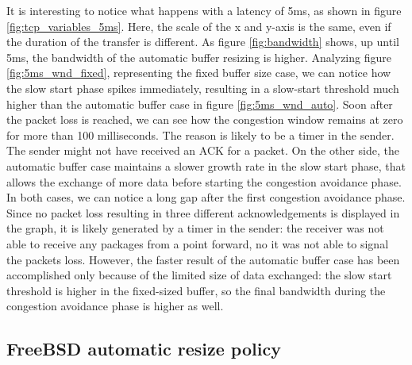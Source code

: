 \documentclass[a4paper,10pt]{article}
\begin{document}
It is interesting to notice what happens with a latency of 5ms, as shown in figure \ref{fig:tcp_variables_5ms}. Here, the scale of the x and y-axis is the same, even if the duration of the transfer is different. As figure \ref{fig:bandwidth} shows, up until 5ms, the bandwidth of the automatic buffer resizing is higher. 
Analyzing figure \ref{fig:5ms_wnd_fixed}, representing the fixed buffer size case, we can notice how the slow start phase spikes immediately, resulting in a slow-start threshold much higher than the automatic buffer case in figure \ref{fig:5ms_wnd_auto}. Soon after the packet loss is reached, we can see how the congestion window remains at zero for more than 100 milliseconds. The reason is likely to be a timer in the sender. The sender might not have received an ACK for a packet.
On the other side, the automatic buffer case maintains a slower growth rate in the slow start phase, that allows the exchange of more data before starting the congestion avoidance phase. In both cases, we can notice a long gap after the first congestion avoidance phase. Since no packet loss resulting in three different acknowledgements is displayed in the graph, it is likely generated by a timer in the sender: the receiver was not able to receive any packages from a point forward, no it was not able to signal the packets loss.
However, the faster result of the automatic buffer case has been accomplished only because of the limited size of data exchanged: the slow start threshold is higher in the fixed-sized buffer, so the final bandwidth during the congestion avoidance phase is higher as well.
\subsection{FreeBSD automatic resize policy}

\end{document}

